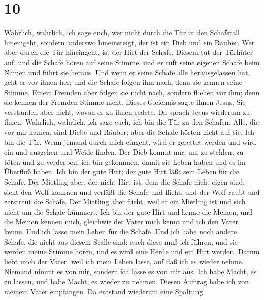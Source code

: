 \hypertarget{section-9}{%
\section{10}\label{section-9}}

 Wahrlich, wahrlich, ich sage euch, wer nicht durch die
Tür in den Schafstall hineingeht, sondern anderswo hineinsteigt, der ist
ein Dieb und ein Räuber.  Wer aber durch die Tür
hineingeht, ist der Hirt der Schafe.  Diesem tut der
Türhüter auf, und die Schafe hören auf seine Stimme, und er ruft seine
eigenen Schafe beim Namen und führt sie heraus.  Und wenn
er seine Schafe alle herausgelassen hat, geht er vor ihnen her; und die
Schafe folgen ihm nach, denn sie kennen seine Stimme. 
Einem Fremden aber folgen sie nicht nach, sondern fliehen vor ihm; denn
sie kennen der Fremden Stimme nicht.  Dieses Gleichnis
sagte ihnen Jesus. Sie verstanden aber nicht, wovon er zu ihnen redete.
 Da sprach Jesus wiederum zu ihnen: Wahrlich, wahrlich,
ich sage euch, ich bin die Tür zu den Schafen.  Alle, die
vor mir kamen, sind Diebe und Räuber; aber die Schafe hörten nicht auf
sie.  Ich bin die Tür. Wenn jemand durch mich eingeht,
wird er gerettet werden und wird ein und ausgehen und Weide finden.
 Der Dieb kommt nur, um zu stehlen, zu töten und zu
verderben; ich bin gekommen, damit sie Leben haben und es im Überfluß
haben.  Ich bin der gute Hirt; der gute Hirt läßt sein
Leben für die Schafe.  Der Mietling aber, der nicht Hirt
ist, dem die Schafe nicht eigen sind, sieht den Wolf kommen und verläßt
die Schafe und flieht; und der Wolf raubt und zerstreut die Schafe.
 Der Mietling aber flieht, weil er ein Mietling ist und
sich nicht um die Schafe kümmert.  Ich bin der gute Hirt
und kenne die Meinen, und die Meinen kennen mich, 
gleichwie der Vater mich kennt und ich den Vater kenne. Und ich lasse
mein Leben für die Schafe.  Und ich habe noch andere
Schafe, die nicht aus diesem Stalle sind; auch diese muß ich führen, und
sie werden meine Stimme hören, und es wird eine Herde und ein Hirt
werden.  Darum liebt mich der Vater, weil ich mein Leben
lasse, auf daß ich es wieder nehme.  Niemand nimmt es von
mir, sondern ich lasse es von mir aus. Ich habe Macht, es zu lassen, und
habe Macht, es wieder zu nehmen. Diesen Auftrag habe ich von meinem
Vater empfangen.  Da entstand wiederum eine Spaltung
